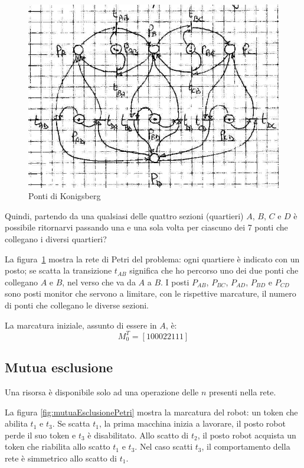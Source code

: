 \documentclass[a4paper]{report}
\begin{document}
\begin{figure}[!h]
  \begin{center}
    \includegraphics[scale=0.4]{./images/pontiKonigsberg01}
    \caption{Ponti di Konigsberg}\label{fig:pontiKonigsberg01}
  \end{center}
\end{figure}
Quindi, partendo da una qualsiasi delle quattro sezioni (quartieri)
$A$, $B$, $C$ e $D$ \`e possibile ritornarvi passando una e una sola
volta per ciascuno dei 7 ponti che collegano i diversi quartieri?

La figura~\ref{fig:pontiKonigsberg01} mostra la rete di Petri del
problema: ogni quartiere \`e indicato con un posto; se scatta la
transizione $t_{AB}$ significa che ho percorso uno dei due ponti che
collegano $A$ e $B$, nel verso che va da $A$ a $B$. I posti $P_{AB}$,
$P_{BC}$, $P_{AD}$, $P_{BD}$ e $P_{CD}$ sono posti monitor che servono
a limitare, con le rispettive marcature, il numero di ponti che
collegano le diverse sezioni.

La marcatura iniziale, assunto di essere in $A$, \`e:
\[
M_0^T = [ 1 0 0 0 2 2 1 1 1 ]
\]




\subsection{Mutua esclusione}
Una risorsa \`e disponibile solo ad una operazione delle $n$ presenti
nella rete.

La figura \ref{fig:mutuaEsclusionePetri} mostra la marcatura del
robot: un token che abilita $t_1$ e $t_3$. Se scatta $t_1$, la prima
macchina inizia a lavorare, il posto robot perde il suo token e $t_3$
\`e disabilitato. Allo scatto di $t_2$, il posto robot acquista un
token che riabilita allo scatto $t_1$ e $t_3$. Nel caso scatti $t_3$,
il comportamento della rete \`e simmetrico allo scatto di $t_1$.
\end{document}
